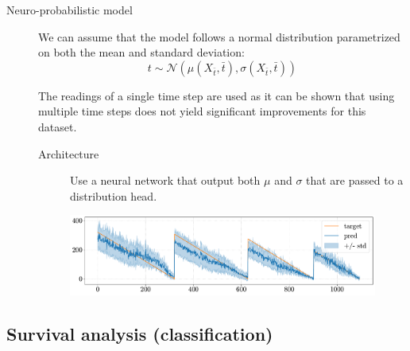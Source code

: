 \begin{description}
    \item[Neuro-probabilistic model]
        We can assume that the model follows a normal distribution parametrized on both the mean and standard deviation:
        \[ t \sim \mathcal{N}(\mu(X_{\bar{t}}, \bar{t}), \sigma(X_{\bar{t}}, \bar{t})) \]

        \begin{remark}
            The readings of a single time step are used as it can be shown that using multiple time steps does not yield significant improvements for this dataset.
        \end{remark}

        \begin{description}
            \item[Architecture]
                Use a neural network that output both $\mu$ and $\sigma$ that are passed to a distribution head.
        \end{description}

        \begin{figure}[H]
            \centering
            \includegraphics[width=0.7\linewidth]{./img/_rul_neuroprobabilistic.pdf}
        \end{figure}
\end{description}


\subsection{Survival analysis (classification)}

